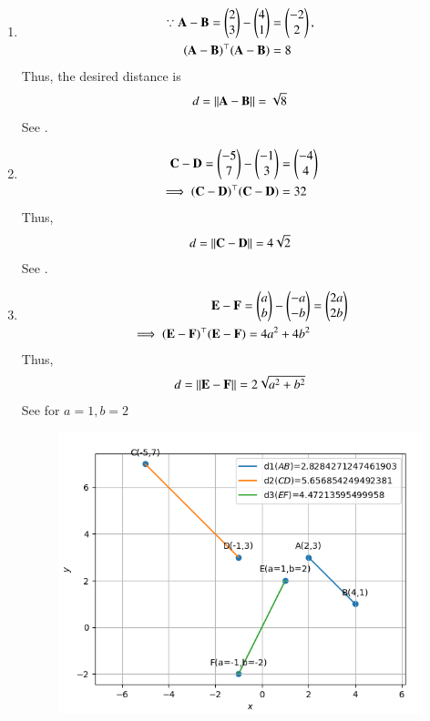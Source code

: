\begin{enumerate}
\item 
	\begin{align}
\because
		\mathbf{A} - \mathbf{B} = \begin{pmatrix}2\\3\end{pmatrix} - \begin{pmatrix}4\\1\end{pmatrix} &= \begin{pmatrix}-2\\2\end{pmatrix},		
\\
(\mathbf{A}-\mathbf{B})^\top (\mathbf{A}-\mathbf{B}) &= 8
	\end{align}
	Thus, the desired distance is 
	\begin{align}
		d=\left\lVert\mathbf{A}-\mathbf{B}\right\rVert =\sqrt{8}
	\end{align}
	See .
\item 
	\begin{align}
		\mathbf{C} - \mathbf{D} = \begin{pmatrix}-5\\7\end{pmatrix} - \begin{pmatrix}-1\\3\end{pmatrix} &= \begin{pmatrix}-4\\4\end{pmatrix}		
		\\
		\implies		(\mathbf{C}-\mathbf{D})^\top (\mathbf{C}-\mathbf{D}) &= 32
	\end{align}
Thus,	
	\begin{align}
		d=\left\lVert\mathbf{C}-\mathbf{D}\right\rVert
 =4\sqrt{2}
\end{align}	
	See .
%	
\item 
	\begin{align}
\mathbf{E} - \mathbf{F} = \begin{pmatrix}a\\b\end{pmatrix} - \begin{pmatrix}-a\\-b\end{pmatrix} &= \begin{pmatrix}2a\\2b\end{pmatrix}		
		\\
		\implies
		(\mathbf{E}-\mathbf{F})^\top (\mathbf{E}-\mathbf{F}) = 4a^2+4b^2 
	\end{align}
Thus,	
	\begin{align}
		d=\left\lVert\mathbf{E}-\mathbf{F}\right\rVert =
2\sqrt{a^2+b^2}
\end{align}	
See  
 for 
$ a=1,b=2$ 
\begin{figure}[H]
	\begin{center} 
	    \includegraphics[width=0.75\columnwidth]{chapters/10/7/1/1/figs/graph.png}
	\end{center}
\caption{}
\label{fig:10/7/1/1Fig}
\end{figure}
\end{enumerate}

